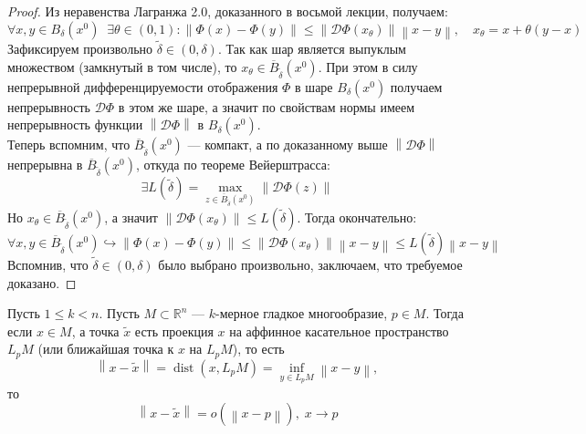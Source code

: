 \documentclass[11pt]{article}
\DeclareMathOperator{\dist}{dist}
\begin{document}
\begin{proof}
    Из неравенства Лагранжа 2.0, доказанного в восьмой лекции, получаем:
    \[\forall x, y \in B_{\delta} (x^0) \; \; \exists \theta \in (0, 1): \left\lVert \Phi (x) - \Phi (y) \right\rVert \leq \left\lVert \mathcal{D} \Phi (x_{\theta}) \right\rVert \left\lVert x - y \right\rVert, \quad x_{\theta} = x + \theta (y - x)\]
    Зафиксируем произвольно $\widetilde{\delta} \in (0, \delta)$. Так как шар является выпуклым множеством (замкнутый в том числе), то $x_{\theta} \in \overline{B}_{\widetilde{\delta}} (x^0)$. При этом в силу непрерывной дифференцируемости отображения $\Phi$ в шаре $B_{\delta} (x^0)$ получаем непрерывность $\mathcal{D} \Phi$ в этом же шаре, а значит по свойствам нормы имеем непрерывность функции $\left\lVert \mathcal{D} \Phi \right\rVert$ в $B_{\delta} (x^0)$.
    \\
    Теперь вспомним, что $\overline{B}_{\widetilde{\delta}} (x^0)$ --- компакт, а по доказанному выше $\left\lVert \mathcal{D} \Phi \right\rVert$ непрерывна в $\overline{B}_{\widetilde{\delta}} (x^0)$, откуда по теореме Вейерштрасса:
    \[\exists L(\widetilde{\delta}) = \max_{z \in \overline{B}_{\widetilde{\delta}} (x^0)} \left\lVert \mathcal{D} \Phi (z) \right\rVert\]
    Но $x_{\theta} \in \overline{B}_{\widetilde{\delta}} (x^0)$, а значит $\left\lVert \mathcal{D} \Phi (x_{\theta}) \right\rVert \leq L(\widetilde{\delta})$. Тогда окончательно:
    \[\forall x, y \in \overline{B}_{\widetilde{\delta}} (x^0) \hookrightarrow \left\lVert \Phi (x) - \Phi (y) \right\rVert \leq \left\lVert \mathcal{D} \Phi (x_{\theta}) \right\rVert \left\lVert x - y \right\rVert \leq L(\widetilde{\delta}) \left\lVert x - y \right\rVert\]
    Вспомнив, что $\widetilde{\delta} \in (0, \delta)$ было выбрано произвольно, заключаем, что требуемое доказано.
\end{proof}

\begin{lemma} \label{lemma:1.2}
    Пусть $1 \leq k < n$. Пусть $M \subset \mathbb{R}^n$ --- $k$-мерное гладкое многообразие, $p \in M$. Тогда если $x \in M$, а точка $\widetilde{x}$ есть проекция $x$ на аффинное касательное пространство $L_p M$ (или ближайшая точка к $x$ на $L_p M$), то есть
    \[\left\lVert x - \widetilde{x} \right\rVert = \dist (x, L_p M) = \inf_{y \in L_p M} \left\lVert x - y \right\rVert,\]
    то 
    \[\left\lVert x - \widetilde{x} \right\rVert = o \left(\left\lVert x - p \right\rVert\right), \; x \to p\]
\end{lemma}
\end{document}
